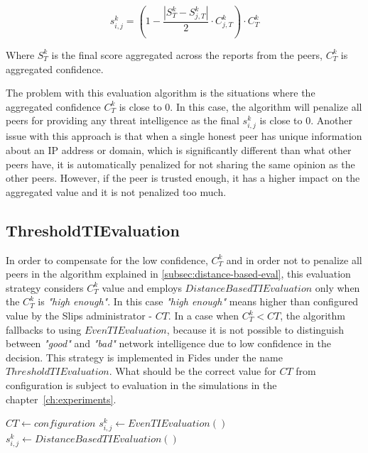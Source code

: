 \begin{equation}
s^{k}_{i, j} = \left(1 - \frac{|{S}^{k}_{T} - S^{k}_{j, T}|}{2} \cdot C^{k}_{j, T}\right) \cdot C^{k}_{T}
\end{equation}

Where $S^{k}_{T}$ is the final score aggregated across the reports from the peers, $C^{k}_{T}$ is aggregated confidence.

The problem with this evaluation algorithm is the situations where the aggregated confidence $C^{k}_{T}$ is close to $0$. In this case, the algorithm will penalize all peers for providing any threat intelligence as the final $s^{k}_{i, j}$ is close to $0$. Another issue with this approach is that when a single honest peer has unique information about an IP address or domain, which is significantly different than what other peers have, it is automatically penalized for not sharing the same opinion as  the other peers. However, if the peer is trusted enough, it has a higher impact on the aggregated value and it is not penalized too much.

\subsection{ThresholdTIEvaluation}
\label{subsec:network-intelligence-conf-high-enough}
In order to compensate for the low confidence, $C^{k}_{T}$ and in order not to penalize all peers in the algorithm explained in \ref{subsec:distance-based-eval}, this evaluation strategy considers $C^{k}_{T}$ value and employs  $DistanceBasedTIEvaluation$ only when the  $C^{k}_{T}$ is \textit{"high enough"}. In this case \textit{"high enough"} means higher than configured value by the Slips administrator - ${CT}$.
In a case when  $C^{k}_{T} < {CT}$, the algorithm fallbacks to using $EvenTIEvaluation$, because it is not possible to distinguish between \textit{"good"} and \textit{"bad"} network intelligence due to low confidence in the decision. 
This strategy is implemented in Fides under the name $ThresholdTIEvaluation$.
What should be the correct value for $CT$ from configuration is subject to evaluation in the simulations in the chapter~\ref{ch:experiments}.

\begin{algorithm}
\caption{$ThresholdTIEvaluation$}\label{alg:threshold-ti-evaluation}
\begin{algorithmic}[1]
\State ${CT} \gets configuration$ 
	\State $s^{k}_{i, j} \gets EvenTIEvaluation()$
\Else
    \State $s^{k}_{i, j} \gets DistanceBasedTIEvaluation()$
\EndIf
\end{algorithmic}
\end{algorithm}

